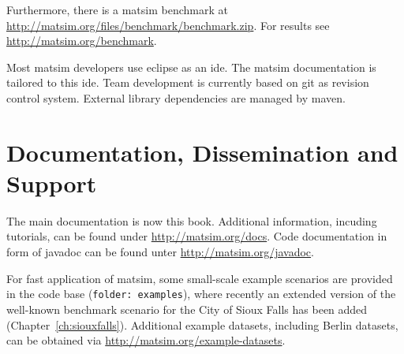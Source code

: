 Furthermore, there is a \gls{matsim} benchmark at \url{http://matsim.org/files/benchmark/benchmark.zip}. For results see \url{http://matsim.org/benchmark}.

Most \gls{matsim} developers use \gls{eclipse} as an \gls{ide}. The \gls{matsim} documentation is tailored to this \gls{ide}. Team development is currently based on \gls{git} as revision control system. External library dependencies are managed by \gls{maven}.

\section{Documentation, Dissemination and Support}

The main documentation is now this book.  Additional information, incuding tutorials, can be found under \url{http://matsim.org/docs}.
%
%
Code documentation in form of \gls{javadoc} can be found unter \url{http://matsim.org/javadoc}.

For fast application of \gls{matsim}, some small-scale example scenarios are provided in the code base (\lstinline|folder: examples|), where recently an extended version of the well-known benchmark scenario for the City of Sioux Falls has been added \citep[][]{ChakirovFourie_TechRep_FCL_2014} (Chapter~\ref{ch:siouxfalls}). %
Additional example datasets, including Berlin datasets, can be obtained via \url{http://matsim.org/example-datasets}.

